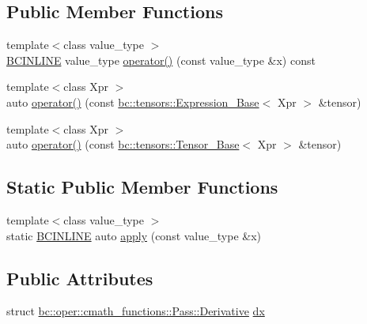 \subsection*{Public Member Functions}
\begin{DoxyCompactItemize}
\item 
{\footnotesize template$<$class value\+\_\+type $>$ }\\\hyperlink{common_8h_a6699e8b0449da5c0fafb878e59c1d4b1}{B\+C\+I\+N\+L\+I\+NE} value\+\_\+type \hyperlink{structbc_1_1oper_1_1cmath__functions_1_1Pass_ae36754a7d9f80cd8c6abbcc098e73d0c}{operator()} (const value\+\_\+type \&x) const
\item 
{\footnotesize template$<$class Xpr $>$ }\\auto \hyperlink{structbc_1_1oper_1_1cmath__functions_1_1Pass_a081139c35d90e67100436fab28c93f7f}{operator()} (const \hyperlink{classbc_1_1tensors_1_1Expression__Base}{bc\+::tensors\+::\+Expression\+\_\+\+Base}$<$ Xpr $>$ \&tensor)
\item 
{\footnotesize template$<$class Xpr $>$ }\\auto \hyperlink{structbc_1_1oper_1_1cmath__functions_1_1Pass_a6ca72e94621958eb0ec2cd43062e98f3}{operator()} (const \hyperlink{classbc_1_1tensors_1_1Tensor__Base}{bc\+::tensors\+::\+Tensor\+\_\+\+Base}$<$ Xpr $>$ \&tensor)
\end{DoxyCompactItemize}
\subsection*{Static Public Member Functions}
\begin{DoxyCompactItemize}
\item 
{\footnotesize template$<$class value\+\_\+type $>$ }\\static \hyperlink{common_8h_a6699e8b0449da5c0fafb878e59c1d4b1}{B\+C\+I\+N\+L\+I\+NE} auto \hyperlink{structbc_1_1oper_1_1cmath__functions_1_1Pass_a1b13fc225f6bb39d6d51b30878a3e16e}{apply} (const value\+\_\+type \&x)
\end{DoxyCompactItemize}
\subsection*{Public Attributes}
\begin{DoxyCompactItemize}
\item 
struct \hyperlink{structbc_1_1oper_1_1cmath__functions_1_1Pass_1_1Derivative}{bc\+::oper\+::cmath\+\_\+functions\+::\+Pass\+::\+Derivative} \hyperlink{structbc_1_1oper_1_1cmath__functions_1_1Pass_a0c0edf33f98149fe35116563ecb3ca52}{dx}
\end{DoxyCompactItemize}



